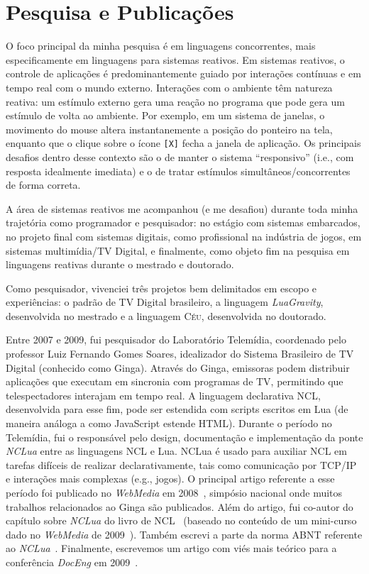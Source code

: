 \documentclass[12pt,a4paper]{article}
\newcommand{\code}[1] {{\small{\texttt{#1}}}}
\newcommand{\CEU}{\textsc{C\'{e}u}\xspace}
\newcommand{\GVT}{\emph{LuaGravity}\xspace}
\begin{document}
\section{Pesquisa e Publicações}

O foco principal da minha pesquisa é em linguagens concorrentes, mais 
especificamente em linguagens para sistemas reativos.
%
Em sistemas reativos, o controle de aplicações é predominantemente guiado por 
interações contínuas e em tempo real com o mundo externo.
%
Interações com o ambiente têm natureza reativa: um estímulo externo gera uma 
reação no programa que pode gera um estímulo de volta ao ambiente.
%
Por exemplo, em um sistema de janelas, o movimento do mouse altera 
instantanemente a posição do ponteiro na tela, enquanto que o clique sobre o 
ícone \code{[X]} fecha a janela de aplicação.
%
Os principais desafios dentro desse contexto são o de manter o sistema 
``responsivo'' (i.e., com resposta idealmente imediata) e o de tratar estímulos 
simultâneos/concorrentes de forma correta.

A área de sistemas reativos me acompanhou (e me desafiou) durante toda minha
trajetória como programador e pesquisador:
no estágio com sistemas embarcados, no projeto final com sistemas digitais, 
como profissional na indústria de jogos, em sistemas multimídia/TV Digital, e 
finalmente, como objeto fim na pesquisa em linguagens reativas durante o 
mestrado e doutorado.

Como pesquisador, vivenciei três projetos bem delimitados em escopo e 
experiências: o padrão de TV Digital brasileiro, a linguagem \GVT, desenvolvida 
no mestrado e a linguagem \CEU, desenvolvida no doutorado.

Entre 2007 e 2009, fui pesquisador do Laboratório Telemídia, coordenado pelo 
professor Luiz Fernando Gomes Soares, idealizador do Sistema Brasileiro de TV 
Digital (conhecido como Ginga).
%
Através do Ginga, emissoras podem distribuir aplicações que executam em 
sincronia com programas de TV, permitindo que telespectadores interajam em 
tempo real.
%
A linguagem declarativa NCL, desenvolvida para esse fim, pode ser estendida com 
scripts escritos em Lua (de maneira análoga a como JavaScript estende HTML).
%
Durante o período no Telemídia, fui o responsável pelo design, documentação e 
implementação da ponte \emph{NCLua} entre as linguagens NCL e Lua.
%
NCLua é usado para auxiliar NCL em tarefas difíceis de realizar 
declarativamente, tais como comunicação por TCP/IP e interações mais complexas 
(e.g., jogos).
%
O principal artigo referente a esse período foi publicado no \emph{WebMedia} em 
2008~\cite{nclua.webmedia}, simpósio nacional onde muitos trabalhos 
relacionados ao Ginga são publicados.
Além do artigo, fui co-autor do capítulo sobre \emph{NCLua} do livro de 
NCL~\cite{nclua.book} (baseado no conteúdo de um mini-curso dado no 
\emph{WebMedia} de 2009~\cite{nclua.shortcourse}).
Também escrevi a parte da norma ABNT referente ao 
\emph{NCLua}~\cite{nclua.abnt}.
Finalmente, escrevemos um artigo com viés mais teórico para a conferência 
\emph{DocEng} em 2009~\cite{nclua.doceng}.
\end{document}
